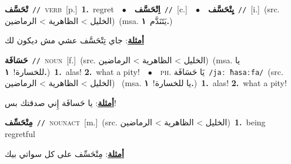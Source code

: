\documentclass[10pt,a4paper,twoside]{article} %
\begin{document}
\begin{multicols}{2}
{\setlength\topsep{0pt}\textbf{\foreignlanguage{arabic}{تْحَسَّف}}\ {\color{gray}\texttt{//}\color{black}}\ \textsc{verb}\ [p.]\ \textbf{1.}~regret\ \ $\bullet$\ \ \setlength\topsep{0pt}\textbf{\foreignlanguage{arabic}{اِتْحَسَّف}}\ {\color{gray}\texttt{//}\color{black}}\ [c.]\ \ $\bullet$\ \ \setlength\topsep{0pt}\textbf{\foreignlanguage{arabic}{يِتْحَسَّف}}\ {\color{gray}\texttt{//}\color{black}}\ [i.]\ (src. \color{gray}\foreignlanguage{arabic}{الخليل > الظاهرية > الرماضين}\color{black})\ \color{gray}(msa. \foreignlanguage{arabic}{يَتَنَدَّم}~\foreignlanguage{arabic}{\textbf{١.}})\color{black}\  \begin{flushright}\color{gray}\foreignlanguage{arabic}{\textbf{\underline{\foreignlanguage{arabic}{أمثلة}}}: جاي تِتْحَسَّف عشي مش ديكون لك}\end{flushright}\color{black}} \vspace{2mm}

{\setlength\topsep{0pt}\textbf{\foreignlanguage{arabic}{حَسَافَة}}\ {\color{gray}\texttt{//}\color{black}}\ \textsc{noun}\ [f.]\ (src. \color{gray}\foreignlanguage{arabic}{الخليل > الظاهرية > الرماضين}\color{black})\ \color{gray}(msa. \foreignlanguage{arabic}{يا للخسارة!}~\foreignlanguage{arabic}{\textbf{١.}})\color{black}\ \textbf{1.}~alas!  \textbf{2.}~what a pity!\ \ $\bullet$\ \ \textsc{ph.} \color{gray} \foreignlanguage{arabic}{يَا حَسَافَة}\color{black}\ {\color{gray}\texttt{/{\sffamily jaː ħasaːfa}/}\color{black}}\ \color{gray}(src. \foreignlanguage{arabic}{الخليل > الظاهرية > الرماضين})\color{black}\ \color{gray} (msa. \foreignlanguage{arabic}{يا للخسارة!}~\foreignlanguage{arabic}{\textbf{١.}})\color{black}\ \textbf{1.}~alas!  \textbf{2.}~what a pity!\  \begin{flushright}\color{gray}\foreignlanguage{arabic}{\textbf{\underline{\foreignlanguage{arabic}{أمثلة}}}: يا حَسافَة إِني صدقتك بس!}\end{flushright}\color{black}} \vspace{2mm}

{\setlength\topsep{0pt}\textbf{\foreignlanguage{arabic}{مِتْحَسِّف}}\ {\color{gray}\texttt{//}\color{black}}\ \textsc{noun\textunderscore act}\ [m.]\ (src. \color{gray}\foreignlanguage{arabic}{الخليل > الظاهرية > الرماضين}\color{black})\ \textbf{1.}~being regretful\  \begin{flushright}\color{gray}\foreignlanguage{arabic}{\textbf{\underline{\foreignlanguage{arabic}{أمثلة}}}: مِتْحَسِّف على كل سواتي بيك}\end{flushright}\color{black}} \vspace{2mm}


\end{multicols}
\end{document}
